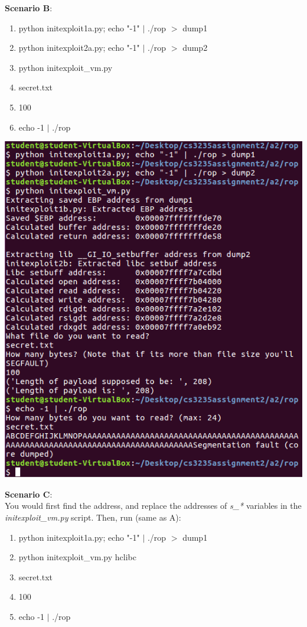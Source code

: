 \documentclass[12pt]{article}
\begin{document}
\newpage
\textbf{Scenario B}:
\begin{enumerate}
    \item python initexploit1a.py; echo "-1" $|$ ./rop $>$ dump1
    \item python initexploit2a.py; echo "-1" $|$ ./rop $>$ dump2
    \item python initexploit\_vm.py
    \item secret.txt
    \item 100
    \item echo -1 $|$ ./rop
\end{enumerate}
\includegraphics[scale=1]{./a2/rop/sceB.PNG}

\newpage
\textbf{Scenario C}:\\
You would first find the address, and replace the addresses of \emph{s\_*} variables in the \emph{initexploit\_vm.py} script. Then, run (same as A):
\begin{enumerate}
    \item python initexploit1a.py; echo "-1" $|$ ./rop $>$ dump1
    \item python initexploit\_vm.py hclibc
    \item secret.txt
    \item 100
    \item echo -1 $|$ ./rop
\end{enumerate}
\end{document}
